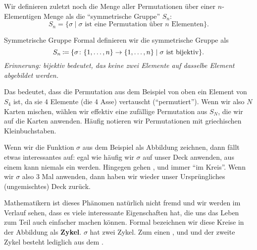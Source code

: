 \documentclass[../../main.tex]{subfiles}
\begin{document}
Wir definieren zuletzt noch die Menge aller Permutationen über einer $n$-Elementigen Menge als die \enquote{symmetrische Gruppe} $S_n$:
\[S_n = \{\sigma \mid \sigma\text{ ist eine Permutation über $n$ Elementen}\}.\]
\begin{advanced}{Symmetrische Gruppe}
    Formal definieren wir die symmetrische Gruppe als
    \[S_n \mathbin{\coloneqq} \{\sigma\colon \{1,\dots, n\}\to\{1,\dots, n\} \mid \sigma\text{ ist bijektiv}\}.\]
    \textit{Erinnerung: bijektiv bedeutet, das keine zwei Elemente auf dasselbe Element abgebildet werden.}
\end{advanced}
Das bedeutet, dass die Permutation aus dem Beispiel von oben ein Element von $S_4$ ist, da sie 4 Elemente (die 4 Asse) vertauscht (\enquote{permutiert}). Wenn wir also $N$ Karten mischen, wählen wir effektiv eine zufällige Permutation aus $S_N$, die wir auf die Karten anwenden.
Häufig notieren wir Permutationen mit griechischen Kleinbuchstaben.


Wenn wir die Funktion $\sigma$ aus dem Beispiel als Abbildung zeichnen, dann fällt etwas interessantes auf: egal wie häufig wir $\sigma$ auf unser Deck anwenden, aus einem \AceDiamond{} kann niemals ein \AceClub{} werden. Hingegen gehen \AceDiamond{}, \AceHeart{} und \AceSpade{} immer \enquote{im Kreis}. Wenn wir $\sigma$ also 3 Mal anwenden, dann haben wir wieder unser Ursprüngliches (ungemischtes) Deck zurück.

Mathematikern ist dieses Phänomen natürlich nicht fremd und wir werden im Verlauf sehen, dass es viele interessante Eigenschaften hat, die uns das Leben zum Teil auch einfacher machen können. Formal bezeichnen wir diese Kreise in der Abbildung als \textbf{Zykel}. $\sigma$ hat zwei Zykel. Zum einen \AceDiamond{}, \AceHeart{} und \AceSpade{} und der zweite Zykel besteht lediglich aus dem \AceClub{}.
\end{document}
